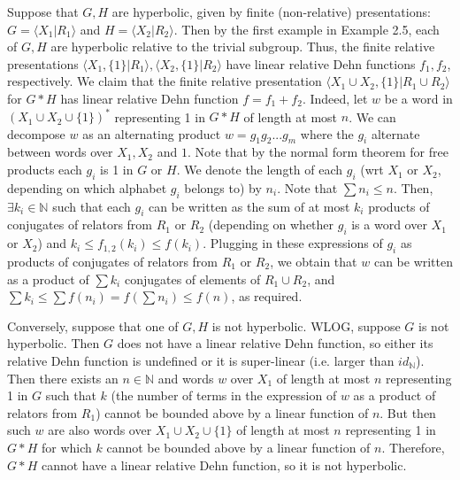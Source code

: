 \documentclass[12pt]{article}
\newcommand{\vs}{\vskip10pt}
\begin{document}
	Suppose that $G,H$ are hyperbolic, given by finite (non-relative) presentations: $G = \langle X_1 \vert R_1 \rangle$ and $H = \langle X_2 \vert R_2 \rangle$. Then by the first example in Example 2.5, each of $G,H$ are hyperbolic relative to the trivial subgroup. Thus, the finite relative presentations $\langle X_1, \{1\} \vert R_1 \rangle, \langle X_2, \{1\} \vert R_2 \rangle$ have linear relative Dehn functions $f_1, f_2$, respectively. We claim that the finite relative presentation $\langle X_1 \cup X_2, \{1\} \vert R_1 \cup R_2 \rangle$ for $G * H$ has linear relative Dehn function $f = f_1 + f_2$. Indeed, let $w$ be a word in $(X_1 \cup X_2 \cup \{1\})^*$ representing 1 in $G * H$ of length at most $n$. We can decompose $w$ as an alternating product $w = g_1 g_2 ... g_m$ where the $g_i$ alternate between words over $X_1, X_2$ and $1$. Note that by the normal form theorem for free products each $g_i$ is 1 in $G$ or $H$. We denote the length of each $g_i$ (wrt $X_1$ or $X_2$, depending on which alphabet $g_i$ belongs to) by $n_i$. Note that $\sum n_i \leq n$. Then, $\exists k_i \in \mathbb{N}$ such that each $g_i$ can be written as the sum of at most $k_i$ products of conjugates of relators from $R_1$ or $R_2$ (depending on whether $g_i$ is a word over $X_1$ or $X_2$) and $k_i \leq f_{1,2}(k_i) \leq f(k_i)$. Plugging in these expressions of $g_i$ as products of conjugates of relators from $R_1$ or $R_2$, we obtain that $w$ can be written as a product of $\sum k_i$ conjugates of elements of $R_1 \cup R_2$, and $\sum k_i \leq \sum f(n_i) = f (\sum n_i) \leq f(n)$, as required. 
	
	\vs 
	
	Conversely, suppose that one of $G,H$ is not hyperbolic. WLOG, suppose $G$ is not hyperbolic. Then $G$ does not have a linear relative Dehn function, so either its relative Dehn function is undefined or it is super-linear (i.e. larger than $id_{\mathbb{N}}$). Then there exists an $n \in \mathbb{N}$ and words $w$ over $X_1$ of length at most $n$ representing 1 in $G$ such that $k$ (the number of terms in the expression of $w$ as a product of relators from $R_1$) cannot be bounded above by a linear function of $n$. But then such $w$ are also words over $X_1 \cup X_2 \cup \{1\}$ of length at most $n$ representing 1 in $G * H$ for which $k$ cannot be bounded above by a linear function of $n$. Therefore, $G * H$ cannot have a linear relative Dehn function, so it is not hyperbolic. 
	
	\vs 
	
\end{document}
